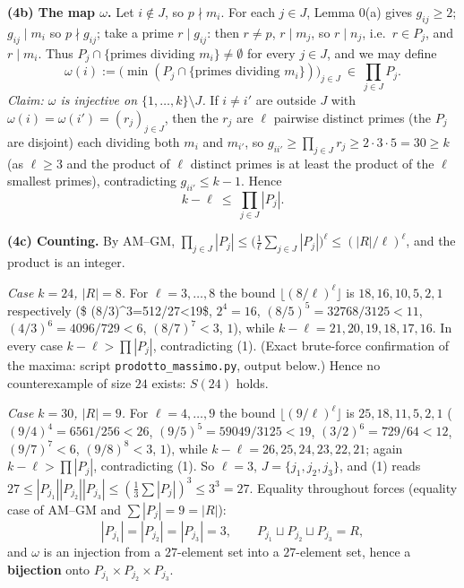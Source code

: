 \documentclass[11pt,a4paper]{article}
\begin{document}
\textbf{(4b) The map \(\omega\).} Let \(i\notin J\), so \(p\nmid m_i\).
For each \(j\in J\), Lemma 0(a) gives \(g_{ij}\ge2\); \(g_{ij}\mid m_i\)
so \(p\nmid g_{ij}\); take a prime \(r\mid g_{ij}\): then \(r\ne p\),
\(r\mid m_j\), so \(r\mid n_j\), i.e.~\(r\in P_j\), and \(r\mid m_i\).
Thus \(P_j\cap\{\text{primes dividing }m_i\}\ne\emptyset\) for every
\(j\in J\), and we may define
\[\omega(i):=\big(\min(P_j\cap\{\text{primes dividing }m_i\})\big)_{j\in J}\ \in\ \prod_{j\in J}P_j .\]
\emph{Claim: \(\omega\) is injective on \(\{1,\dots,k\}\setminus J\).}
If \(i\ne i'\) are outside \(J\) with
\(\omega(i)=\omega(i')=(r_j)_{j\in J}\), then the \(r_j\) are \(\ell\)
pairwise distinct primes (the \(P_j\) are disjoint) each dividing both
\(m_i\) and \(m_{i'}\), so
\(g_{ii'}\ge\prod_{j\in J}r_j\ge 2\cdot3\cdot5=30\ge k\) (as
\(\ell\ge3\) and the product of \(\ell\) distinct primes is at least the
product of the \(\ell\) smallest primes), contradicting
\(g_{ii'}\le k-1\). Hence \[k-\ell\ \le\ \prod_{j\in J}|P_j| . \tag{1}\]

\textbf{(4c) Counting.} By AM--GM,
\(\prod_{j\in J}|P_j|\le\big(\tfrac1\ell\sum_{j\in J}|P_j|\big)^{\ell}\le(|R|/\ell)^{\ell}\),
and the product is an integer.

\emph{Case \(k=24\), \(|R|=8\).} For \(\ell=3,\dots,8\) the bound
\(\lfloor (8/\ell)^\ell\rfloor\) is \(18,16,10,5,2,1\) respectively (\$
(8/3)\^{}3=512/27\textless19\$, \(2^4=16\), \((8/5)^5=32768/3125<11\),
\((4/3)^6=4096/729<6\), \((8/7)^7<3\), \(1\)), while
\(k-\ell=21,20,19,18,17,16\). In every case \(k-\ell>\prod|P_j|\),
contradicting (1). (Exact brute-force confirmation of the maxima: script
\texttt{prodotto\_massimo.py}, output below.) Hence no counterexample of
size \(24\) exists: \(S(24)\) holds.

\emph{Case \(k=30\), \(|R|=9\).} For \(\ell=4,\dots,9\) the bound
\(\lfloor (9/\ell)^\ell\rfloor\) is \(25,18,11,5,2,1\)
(\((9/4)^4=6561/256<26\), \((9/5)^5=59049/3125<19\),
\((3/2)^6=729/64<12\), \((9/7)^7<6\), \((9/8)^8<3\), \(1\)), while
\(k-\ell=26,25,24,23,22,21\); again \(k-\ell>\prod|P_j|\), contradicting
(1). So \(\ell=3\), \(J=\{j_1,j_2,j_3\}\), and (1) reads
\(27\le|P_{j_1}||P_{j_2}||P_{j_3}|\le(\tfrac13\sum|P_j|)^3\le 3^3=27\).
Equality throughout forces (equality case of AM--GM and
\(\sum|P_j|=9=|R|\)):
\[|P_{j_1}|=|P_{j_2}|=|P_{j_3}|=3,\qquad P_{j_1}\sqcup P_{j_2}\sqcup P_{j_3}=R,\]
and \(\omega\) is an injection from a \(27\)-element set into a
\(27\)-element set, hence a \textbf{bijection} onto
\(P_{j_1}\times P_{j_2}\times P_{j_3}\).
\end{document}
